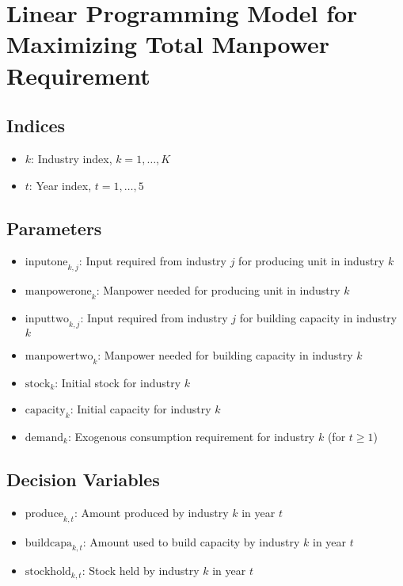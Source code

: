 \documentclass{article}
\begin{document}
\section*{Linear Programming Model for Maximizing Total Manpower Requirement}

\subsection*{Indices}
\begin{itemize}
    \item $k$: Industry index, $k = 1, \ldots, K$
    \item $t$: Year index, $t = 1, \ldots, 5$
\end{itemize}

\subsection*{Parameters}
\begin{itemize}
    \item $\text{inputone}_{k, j}$: Input required from industry $j$ for producing unit in industry $k$
    \item $\text{manpowerone}_{k}$: Manpower needed for producing unit in industry $k$
    \item $\text{inputtwo}_{k, j}$: Input required from industry $j$ for building capacity in industry $k$
    \item $\text{manpowertwo}_{k}$: Manpower needed for building capacity in industry $k$
    \item $\text{stock}_{k}$: Initial stock for industry $k$
    \item $\text{capacity}_{k}$: Initial capacity for industry $k$
    \item $\text{demand}_{k}$: Exogenous consumption requirement for industry $k$ (for $t \geq 1$)
\end{itemize}

\subsection*{Decision Variables}
\begin{itemize}
    \item $\text{produce}_{k, t}$: Amount produced by industry $k$ in year $t$
    \item $\text{buildcapa}_{k, t}$: Amount used to build capacity by industry $k$ in year $t$
    \item $\text{stockhold}_{k, t}$: Stock held by industry $k$ in year $t$
\end{itemize}
\end{document}
